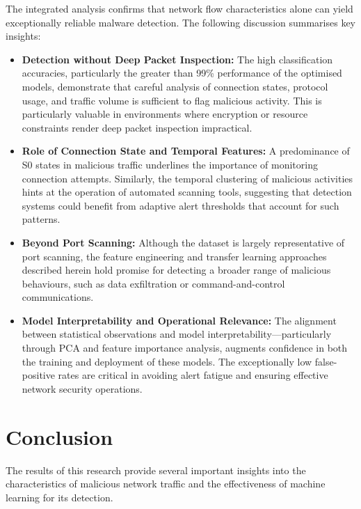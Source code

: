The integrated analysis confirms that network flow characteristics alone can yield exceptionally reliable malware detection. The following discussion summarises key insights:

\begin{itemize}
    \item \textbf{Detection without Deep Packet Inspection:}  
    The high classification accuracies, particularly the greater than 99\% performance of the optimised models, demonstrate that careful analysis of connection states, protocol usage, and traffic volume is sufficient to flag malicious activity. This is particularly valuable in environments where encryption or resource constraints render deep packet inspection impractical.
    
    \item \textbf{Role of Connection State and Temporal Features:}  
    A predominance of S0 states in malicious traffic underlines the importance of monitoring connection attempts. Similarly, the temporal clustering of malicious activities hints at the operation of automated scanning tools, suggesting that detection systems could benefit from adaptive alert thresholds that account for such patterns.
    
    \item \textbf{Beyond Port Scanning:}  
    Although the dataset is largely representative of port scanning, the feature engineering and transfer learning approaches described herein hold promise for detecting a broader range of malicious behaviours, such as data exfiltration or command-and-control communications.
    
    \item \textbf{Model Interpretability and Operational Relevance:}  
    The alignment between statistical observations and model interpretability—particularly through PCA and feature importance analysis, augments confidence in both the training and deployment of these models. The exceptionally low false-positive rates are critical in avoiding alert fatigue and ensuring effective network security operations.
\end{itemize}

\section{Conclusion}
The results of this research provide several important insights into the characteristics of malicious network traffic and the effectiveness of machine learning for its detection.

